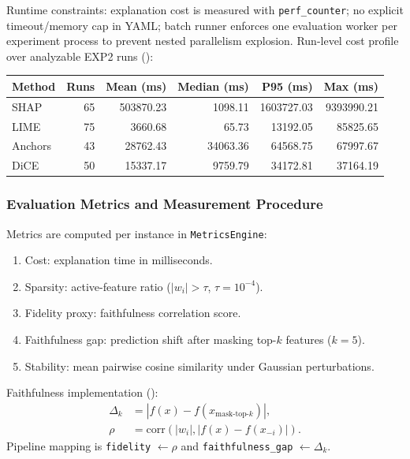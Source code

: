 \documentclass[twoside,11pt]{article}
\begin{document}
Runtime constraints: explanation cost is measured with \texttt{perf\_counter};
no explicit timeout/memory cap in YAML; batch runner enforces one evaluation
worker per experiment process to prevent nested parallelism explosion.
Run-level cost profile over analyzable EXP2 runs
():
\begin{center}
\begin{tabular}{lrrrrr}
\toprule
Method & Runs & Mean (ms) & Median (ms) & P95 (ms) & Max (ms) \\
\midrule
SHAP    & 65 & 503870.23 & 1098.11 & 1603727.03 & 9393990.21 \\
LIME    & 75 & 3660.68   & 65.73   & 13192.05   & 85825.65 \\
Anchors & 43 & 28762.43  & 34063.36 & 64568.75  & 67997.67 \\
DiCE    & 50 & 15337.17  & 9759.79 & 34172.81   & 37164.19 \\
\bottomrule
\end{tabular}
\end{center}

\subsubsection{Evaluation Metrics and Measurement Procedure}
Metrics are computed per instance in \texttt{MetricsEngine}:
\begin{enumerate}[leftmargin=*]
    \item Cost: explanation time in milliseconds.
    \item Sparsity: active-feature ratio ($|w_i|>\tau$, $\tau=10^{-4}$).
    \item Fidelity proxy: faithfulness correlation score.
    \item Faithfulness gap: prediction shift after masking top-$k$ features ($k=5$).
    \item Stability: mean pairwise cosine similarity under Gaussian perturbations.
\end{enumerate}

Faithfulness implementation ():
\begin{align}
\Delta_k &= \left|f(x)-f\left(x_{\text{mask-top-}k}\right)\right|,\\
\rho &= \mathrm{corr}\left(|w_i|,\left|f(x)-f(x_{-i})\right|\right).
\end{align}
Pipeline mapping is \texttt{fidelity} $\leftarrow \rho$ and
\texttt{faithfulness\_gap} $\leftarrow \Delta_k$.
\end{document}
